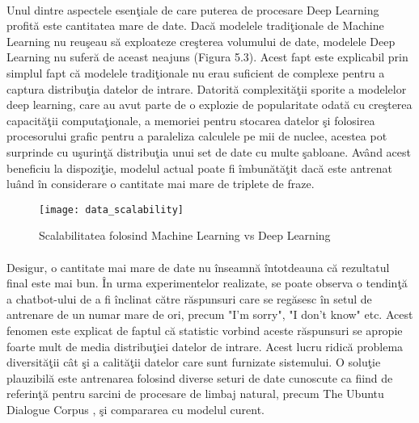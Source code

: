 \paragraph{}
Unul dintre aspectele esen\c tiale de care puterea de procesare Deep Learning profit\u a este cantitatea mare de date. Dac\u a modelele tradi\c tionale de Machine Learning nu reu\c seau s\u a exploateze cre\c sterea volumului de date, modelele Deep Learning nu sufer\u a de aceast neajuns (Figura 5.3). Acest fapt este explicabil prin simplul fapt c\u a modelele tradi\c tionale nu erau suficient de complexe pentru a captura distribu\c tia datelor de intrare. Datorit\u a complexit\u a\c tii sporite a modelelor deep learning, care au avut parte de o explozie de popularitate odat\u a cu cre\c sterea capacit\u a\c tii computa\c tionale, a memoriei pentru stocarea datelor \c si folosirea procesorului grafic pentru a paraleliza calculele pe mii de nuclee, acestea pot surprinde cu u\c surin\c t\u a distribu\c tia unui set de date cu multe \c sabloane. Av\^ and acest beneficiu la dispozi\c tie, modelul actual poate fi \^ imbun\u at\u a\c tit dac\u a este antrenat lu\^ and \^ in considerare o cantitate mai mare de triplete de fraze.

\begin{figure}[H]
\centering
\texttt{[image: data\_scalability]}
\caption{Scalabilitatea folosind Machine Learning vs Deep Learning}
\end{figure}

\paragraph{}
Desigur, o cantitate mai mare de date nu \^ inseamn\u a \^ intotdeauna c\u a rezultatul final este mai bun. \^ In urma experimentelor realizate, se poate observa o tendin\c t\u a a chatbot-ului de a fi \^ inclinat c\u atre r\u aspunsuri care se reg\u asesc \^ in setul de antrenare de un numar mare de ori, precum "I'm sorry", "I don't know" etc. Acest fenomen este explicat de faptul c\u a statistic vorbind aceste r\u aspunsuri se apropie foarte mult de media distribu\c tiei datelor de intrare. Acest lucru ridic\u a problema diversit\u a\c tii c\^ at \c si a calit\u a\c tii datelor care sunt furnizate sistemului. O solu\c tie plauzibil\u a este antrenarea folosind diverse seturi de date cunoscute ca fiind de referin\c t\u a pentru sarcini de procesare de limbaj natural, precum The Ubuntu Dialogue Corpus \cite{DBLP:journals/corr/LowePSP15}, \c si compararea cu modelul curent.




